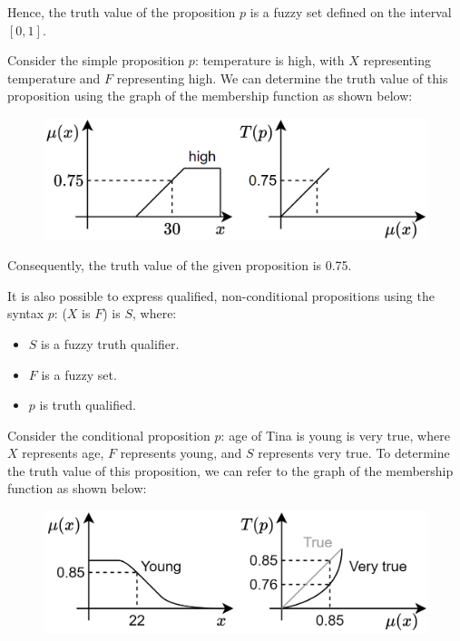 Hence, the truth value of the proposition $p$ is a fuzzy set defined on the interval $[0,1]$.
\begin{example}
    Consider the simple proposition $p$: temperature is high, with $X$ representing temperature and $F$ representing high. 
    We can determine the truth value of this proposition using the graph of the membership function as shown below:        
    \begin{figure}[H]
        \centering
        \includegraphics[width=0.5\linewidth]{images/temperature.png}
    \end{figure}
    Consequently, the truth value of the given proposition is 0.75.
\end{example}

It is also possible to express qualified, non-conditional propositions using the syntax $p$: ($X$ is $F$) is $S$, where:
\begin{itemize}
    \item $S$ is a fuzzy truth qualifier.
    \item $F$ is a fuzzy set.
    \item $p$ is truth qualified.
\end{itemize}
\begin{example}
    Consider the conditional proposition $p$: age of Tina is young is very true, where $X$ represents age, $F$ represents young, and $S$ represents very true. 
    To determine the truth value of this proposition, we can refer to the graph of the membership function as shown below:
    \begin{figure}[H]
        \centering
        \includegraphics[width=0.5\linewidth]{images/age.png}
    \end{figure}
\end{example}

